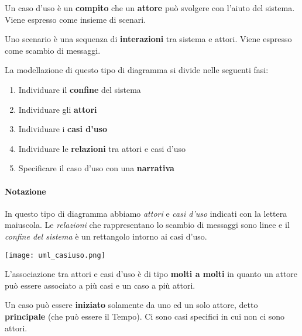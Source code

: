\begin{definition}
	Un caso d'uso è un \textbf{compito} che un \textbf{attore} può svolgere con l'aiuto del sistema. Viene espresso come insieme di scenari.
\end{definition}

\begin{definition}[Scenario]
	Uno scenario è una sequenza di \textbf{interazioni} tra sistema e attori. Viene espresso come scambio di messaggi.
\end{definition}

\noindent La modellazione di questo tipo di diagramma si divide nelle seguenti fasi:
\begin{enumerate}
	\item Individuare il \textbf{confine} del sistema
	\item Individuare gli \textbf{attori}
	\item Individuare i \textbf{casi d'uso}
	\item Individuare le \textbf{relazioni} tra attori e casi d'uso
	\item Specificare il caso d'uso con una \textbf{narrativa}
\end{enumerate}

\paragraph{Notazione} In questo tipo di diagramma abbiamo \textit{attori} e \textit{casi d'uso} indicati con la lettera maiuscola. Le \textit{relazioni} che rappresentano lo scambio di messaggi sono linee e il \textit{confine del sistema} è un rettangolo intorno ai casi d'uso.
\begin{center}
	\texttt{[image: uml\_casiuso.png]}
\end{center}

\begin{note}
	L'associazione tra attori e casi d'uso è di tipo \textbf{molti a molti} in quanto un attore può essere associato a più casi e un caso a più attori.
\end{note}

\begin{note}
	Un caso può essere \textbf{iniziato} solamente da uno ed un solo attore, detto \textbf{principale} (che può essere il Tempo). Ci sono casi specifici in cui non ci sono attori.
\end{note}

\newpage
